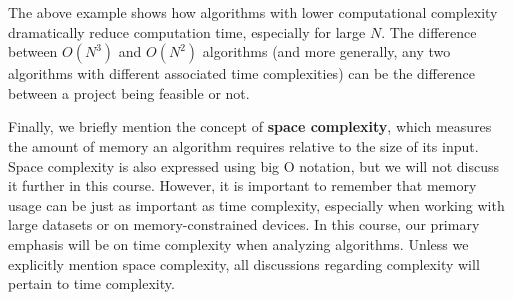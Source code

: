 The above example shows how algorithms with lower computational complexity dramatically reduce computation time, especially for large $N$. The difference between $O(N^3)$ and $O(N^2)$ algorithms (and more generally, any two algorithms with different associated time complexities) can be the difference between a project being feasible or not.

Finally, we briefly mention the concept of \textbf{space complexity}, which measures the amount of memory an algorithm requires relative to the size of its input. Space complexity is also expressed using big O notation, but we will not discuss it further in this course. However, it is important to remember that memory usage can be just as important as time complexity, especially when working with large datasets or on memory-constrained devices.
In this course, our primary emphasis will be on time complexity when analyzing algorithms.
Unless we explicitly mention space complexity, all discussions regarding complexity will pertain to time complexity.


